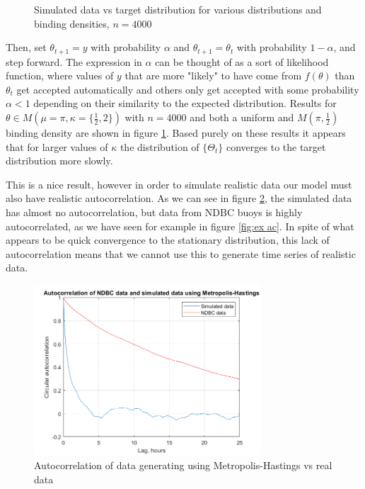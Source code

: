 \documentclass[12pt]{article}
\numberwithin{equation}{section}
\numberwithin{figure}{section}
\begin{document}
\begin{figure}[h]
{}
\caption{Simulated data vs target distribution for various distributions and binding densities, $n=4000$}\label{fig:mhexamples}
\end{figure}

Then, set $\theta_{t+1}=y$ with probability $\alpha$ and $\theta_{t+1}=\theta_t$ with probability $1-\alpha$, and step forward. The expression in $\alpha$ can be thought of as a sort of likelihood function, where values of $y$ that are more "likely" to have come from $f(\theta)$ than $\theta_t$ get accepted automatically and others only get accepted with some probability $\alpha <1$ depending on their similarity to the expected distribution. Results for $\theta \in M(\mu = \pi, \kappa = \{\frac{1}{2}, 2\})$ with $n=4000$ and both a uniform and $M(\pi,\frac{1}{2})$ binding density are shown in figure \ref{fig:mhexamples}. Based purely on these results it appears that for larger values of $\kappa$ the distribution of $\{\Theta_t\}$ converges to the target distribution more slowly. 

This is a nice result, however in order to simulate realistic data our model must also have realistic autocorrelation. As we can see in figure \ref{fig:mh ac}, the simulated data has almost no autocorrelation, but data from NDBC buoys is highly autocorrelated, as we have seen for example in figure \ref{fig:ex ac}. In spite of what appears to be quick convergence to the stationary distribution, this lack of autocorrelation means that we cannot use this to generate time series of realistic data.

\begin{figure}[h]
\centering
\includegraphics[width=85mm]{New Folder/ac data v model.png}
\caption{Autocorrelation of data generating using Metropolis-Hastings vs real data}\label{fig:mh ac}
\end{figure}
\end{document}
